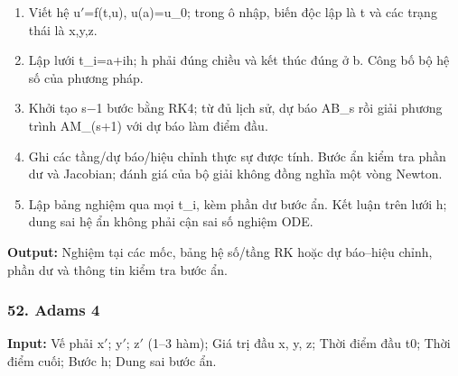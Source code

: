 \begin{enumerate}

\item Viết hệ u\ensuremath{\prime}=\allowbreak{}f(\allowbreak{}t,\allowbreak{}u),\allowbreak{} u(\allowbreak{}a)=\allowbreak{}u\_0;\allowbreak{} trong ô nhập,\allowbreak{} biến độc lập là t và các trạng thái là x,\allowbreak{}y,\allowbreak{}z.

\item Lập lưới t\_i=\allowbreak{}a+\allowbreak{}ih;\allowbreak{} h phải đúng chiều và kết thúc đúng ở b. Công bố bộ hệ số của phương pháp.

\item Khởi tạo s\ensuremath{-}1 bước bằng RK4;\allowbreak{} từ đủ lịch sử,\allowbreak{} dự báo AB\_s rồi giải phương trình AM\_(\allowbreak{}s+\allowbreak{}1) với dự báo làm điểm đầu.

\item Ghi các tầng/\allowbreak{}dự báo/\allowbreak{}hiệu chỉnh thực sự được tính. Bước ẩn kiểm tra phần dư và Jacobian;\allowbreak{} đánh giá của bộ giải không đồng nghĩa một vòng Newton.

\item Lập bảng nghiệm qua mọi t\_i,\allowbreak{} kèm phần dư bước ẩn. Kết luận trên lưới h;\allowbreak{} dung sai hệ ẩn không phải cận sai số nghiệm ODE.

\end{enumerate}

\textbf{Output:} Nghiệm tại các mốc,\allowbreak{} bảng hệ số/\allowbreak{}tầng RK hoặc dự báo–hiệu chỉnh,\allowbreak{} phần dư và thông tin kiểm tra bước ẩn.

\examplebreak\subsubsection*{52. Adams 4}

\textbf{Input:} Vế phải x\ensuremath{\prime};\allowbreak{} y\ensuremath{\prime};\allowbreak{} z\ensuremath{\prime} (\allowbreak{}1–3 hàm);\allowbreak{} Giá trị đầu x,\allowbreak{} y,\allowbreak{} z;\allowbreak{} Thời điểm đầu t0;\allowbreak{} Thời điểm cuối;\allowbreak{} Bước h;\allowbreak{} Dung sai bước ẩn.

